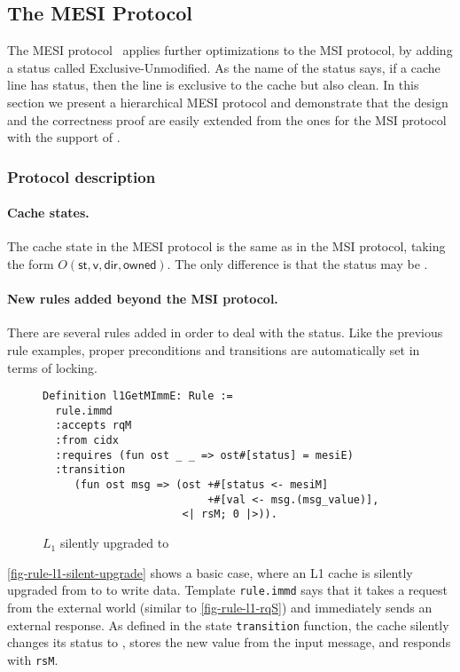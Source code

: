 \documentclass[sigplan,10pt,review,anonymous,screen]{acmart}\settopmatter{printfolios=true,printccs=false,printacmref=false}
\def\slstinline{\lstinline[basicstyle=\ttfamily\small]}
\begin{document}
\subsection{The MESI Protocol}
\label{sec-mesi-protocol}

The MESI protocol~\cite{Papamarcos:1984} applies further optimizations to the MSI protocol, by adding a status called Exclusive-Unmodified.
As the name of the status says, if a cache line has \stE{} status, then the line is exclusive to the cache but also clean.
In this section we present a hierarchical MESI protocol and demonstrate that the design and the correctness proof are easily extended from the ones for the MSI protocol with the support of \hemiola{}.

\subsubsection{Protocol description}

\paragraph{Cache states.}
The cache state in the MESI protocol is the same as in the MSI protocol, taking the form $O(\textsf{st}, \textsf{v}, \textsf{dir}, \textsf{owned})$.
The only difference is that the status may be \stE{}.

\paragraph{New rules added beyond the MSI protocol.}
There are several rules added in order to deal with the \stE{} status.
Like the previous rule examples, proper preconditions and transitions are automatically set in terms of locking.

\begin{figure}[h]
  \centering
\begin{lstlisting}
Definition l1GetMImmE: Rule :=
  rule.immd
  :accepts rqM
  :from cidx
  :requires (fun ost _ _ => ost#[status] = mesiE)
  :transition
     (fun ost msg => (ost +#[status <- mesiM]
                          +#[val <- msg.(msg_value)],
                      <| rsM; 0 |>)).
\end{lstlisting}
  \caption{$L_1$ silently upgraded to \stM{}}
  \label{fig-rule-l1-silent-upgrade}
\end{figure}

\autoref{fig-rule-l1-silent-upgrade} shows a basic case, where an L1 cache is silently upgraded from \stE{} to \stM{} to write data.
Template \slstinline{rule.immd} says that it takes a request from the external world (similar to \autoref{fig-rule-l1-rqS}) and immediately sends an external response.
As defined in the state \slstinline{transition} function, the cache silently changes its status to \stM{}, stores the new value from the input message, and responds with \slstinline{rsM}.
\end{document}
